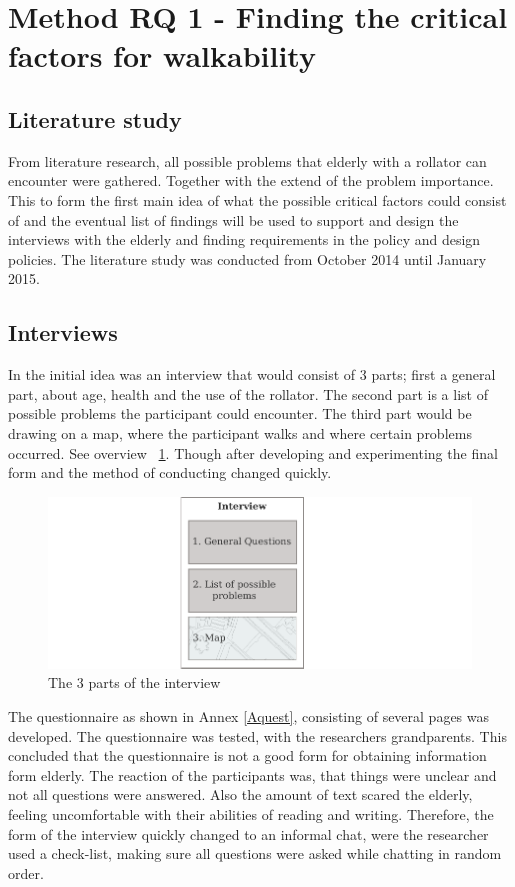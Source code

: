 \section{Method RQ 1 - Finding the critical factors for walkability}
\subsection{Literature study}
From literature research, all possible problems that elderly with a rollator can encounter were gathered. Together with the extend of the problem importance. This to form the first main idea of what the possible critical factors could consist of and the eventual list of findings will be used to support and design the interviews with the elderly and finding requirements in the policy and design policies.
The literature study was conducted from October 2014 until January 2015. 

\subsection{Interviews}
In the initial idea was an interview that would consist of 3 parts; first a general part, about age, health and the use of the rollator. The second part is a list of possible problems the participant could encounter. The third part would be drawing on a map, where the participant walks and where certain problems occurred. See overview ~\ref{interview}. Though after developing and experimenting the final form and the method of conducting changed quickly. 

\begin{figure}[h]
\includegraphics[width=\textwidth]{img/M_interview.pdf}
\centering
\caption{The 3 parts of the interview \label{interview}}
\end{figure}

The questionnaire as shown in Annex \ref{Aquest}, consisting of several pages was developed. The questionnaire was tested, with the researchers grandparents. This concluded that the questionnaire is not a good form for obtaining information form elderly. The reaction of the participants was, that things were unclear and not all questions were answered.  Also the amount of text scared the elderly, feeling uncomfortable with their abilities of reading and writing. Therefore, the form of the interview quickly changed to an informal chat, were the researcher used a check-list, making sure all questions were asked while chatting in random order.

